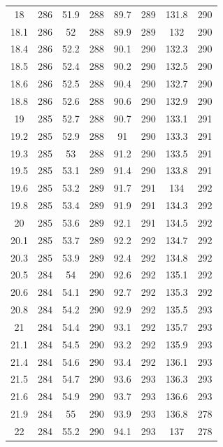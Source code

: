 \documentclass[12pt]{ctexart}
\numberwithin{equation}{section}
\begin{document}
\begin{longtable}{cc|cc|cc|cc}
18  &  286  &  51.9  &  288  &  89.7  &  289  &  131.8  &  290  \\
18.1  &  286  &  52  &  288  &  89.9  &  289  &  132  &  290  \\
18.4  &  286  &  52.2  &  288  &  90.1  &  290  &  132.3  &  290  \\
18.5  &  286  &  52.4  &  288  &  90.2  &  290  &  132.5  &  290  \\
18.6  &  286  &  52.5  &  288  &  90.4  &  290  &  132.7  &  290  \\
18.8  &  286  &  52.6  &  288  &  90.6  &  290  &  132.9  &  290  \\
19  &  285  &  52.7  &  288  &  90.7  &  290  &  133.1  &  291  \\
19.2  &  285  &  52.9  &  288  &  91  &  290  &  133.3  &  291  \\
19.3  &  285  &  53  &  288  &  91.2  &  290  &  133.5  &  291  \\
19.5  &  285  &  53.1  &  289  &  91.4  &  290  &  133.8  &  291  \\
19.6  &  285  &  53.2  &  289  &  91.7  &  291  &  134  &  292  \\
19.8  &  285  &  53.4  &  289  &  91.9  &  291  &  134.3  &  292  \\
20  &  285  &  53.6  &  289  &  92.1  &  291  &  134.5  &  292  \\
20.1  &  285  &  53.7  &  289  &  92.2  &  292  &  134.7  &  292  \\
20.3  &  285  &  53.9  &  289  &  92.4  &  292  &  134.8  &  292  \\
20.5  &  284  &  54  &  290  &  92.6  &  292  &  135.1  &  292  \\
20.6  &  284  &  54.1  &  290  &  92.7  &  292  &  135.3  &  292  \\
20.8  &  284  &  54.2  &  290  &  92.9  &  292  &  135.5  &  293  \\
21  &  284  &  54.4  &  290  &  93.1  &  292  &  135.7  &  293  \\
21.1  &  284  &  54.5  &  290  &  93.2  &  292  &  135.9  &  293  \\
21.4  &  284  &  54.6  &  290  &  93.4  &  292  &  136.1  &  293  \\
21.5  &  284  &  54.7  &  290  &  93.6  &  293  &  136.3  &  293  \\
21.6  &  284  &  54.9  &  290  &  93.7  &  293  &  136.6  &  293  \\
21.9  &  284  &  55  &  290  &  93.9  &  293  &  136.8  &  278  \\
22  &  284  &  55.2  &  290  &  94.1  &  293  &  137  &  278  \\

\end{longtable}
\end{document}
